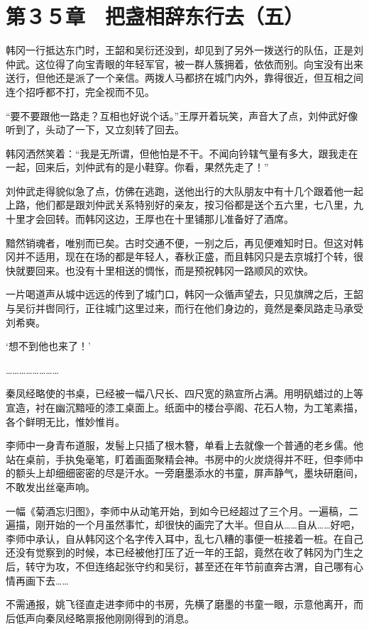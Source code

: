 \section{第３５章　把盏相辞东行去（五）}

韩冈一行抵达东门时，王韶和吴衍还没到，却见到了另外一拨送行的队伍，正是刘仲武。这位得了向宝青眼的年轻军官，被一群人簇拥着，依依而别。向宝没有出来送行，但他还是派了一个亲信。两拨人马都挤在城门内外，靠得很近，但互相之间连个招呼都不打，完全视而不见。

“要不要跟他一路走？互相也好说个话。”王厚开着玩笑，声音大了点，刘仲武好像听到了，头动了一下，又立刻转了回去。

韩冈洒然笑着：“我是无所谓，但他怕是不干。不闻向钤辖气量有多大，跟我走在一起，回来后，刘仲武有的是小鞋穿。你看，果然先走了！”

刘仲武走得貌似急了点，仿佛在逃跑，送他出行的大队朋友中有十几个跟着他一起上路，他们都是跟刘仲武关系特别好的亲友，按习俗都是送个五六里，七八里，九十里才会回转。而韩冈这边，王厚也在十里铺那儿准备好了酒席。

黯然销魂者，唯别而已矣。古时交通不便，一别之后，再见便难知时日。但这对韩冈并不适用，现在在场的都是年轻人，春秋正盛，而且韩冈只是去京城打个转，很快就要回来。也没有十里相送的惆怅，而是预祝韩冈一路顺风的欢快。

一片喝道声从城中远远的传到了城门口，韩冈一众循声望去，只见旗牌之后，王韶与吴衍并辔同行，正往城门这里过来，而行在他们身边的，竟然是秦凤路走马承受刘希奭。

‘想不到他也来了！’

……………………

秦凤经略使的书桌，已经被一幅八尺长、四尺宽的熟宣所占满。用明矾蜡过的上等宣造，衬在幽沉黯哑的漆工桌面上。纸面中的楼台亭阁、花石人物，为工笔素描，各个鲜明无比，惟妙惟肖。

李师中一身青布道服，发髻上只插了根木簪，单看上去就像一个普通的老乡儒。他站在桌前，手执兔毫笔，盯着画面聚精会神。书房中的火炭烧得并不旺，但李师中的额头上却细细密密的尽是汗水。一旁磨墨添水的书童，屏声静气，墨块研磨间，不敢发出丝毫声响。

一幅《菊酒忘归图》，李师中从动笔开始，到如今已经超过了三个月。一遍稿，二遍描，刚开始的一个月虽然事忙，却很快的画完了大半。但自从……自从……好吧，李师中承认，自从韩冈这个名字传入耳中，乱七八糟的事便一桩接着一桩。在自己还没有觉察到的时候，本已经被他打压了近一年的王韶，竟然在收了韩冈为门生之后，转守为攻，不但连络起张守约和吴衍，甚至还在年节前直奔古渭，自己哪有心情再画下去……

不需通报，姚飞径直走进李师中的书房，先横了磨墨的书童一眼，示意他离开，而后低声向秦凤经略禀报他刚刚得到的消息。

